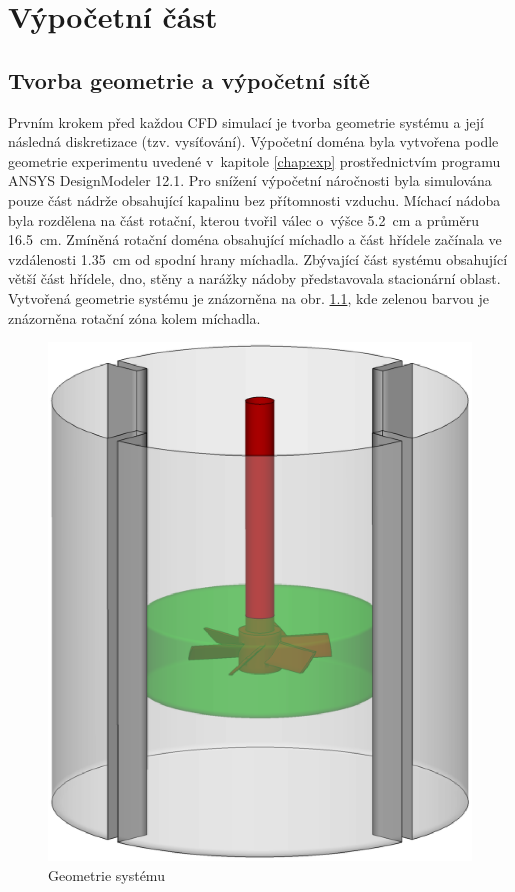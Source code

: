 \chapter{Výpočetní část}

\section{Tvorba geometrie a výpočetní sítě}

Prvním krokem před každou CFD simulací je tvorba geometrie systému a její následná diskretizace (tzv. vysíťování). Výpočetní doména byla vytvořena podle geometrie experimentu uvedené v~kapitole \ref{chap:exp} prostřednictvím programu ANSYS DesignModeler 12.1. Pro snížení výpočetní náročnosti byla simulována pouze část nádrže obsahující kapalinu bez přítomnosti vzduchu. Míchací nádoba byla rozdělena na část rotační, kterou tvořil válec o~výšce \SI{5.2}{\centi\meter} a průměru \SI{16.5}{\centi\meter}. Zmíněná rotační doména obsahující míchadlo a část hřídele začínala ve vzdálenosti \SI{1.35}{\centi\meter} od spodní hrany míchadla. Zbývající část systému obsahující větší část hřídele, dno, stěny a narážky nádoby představovala stacionární oblast. Vytvořená geometrie systému je znázorněna na obr. \ref{fig:geo}, kde zelenou barvou je znázorněna rotační zóna kolem míchadla. 

\begin{figure}[h!]
\centering
\includegraphics[scale=0.5]{images/geo.eps}
\caption{Geometrie systému}
\label{fig:geo}
\end{figure} 

